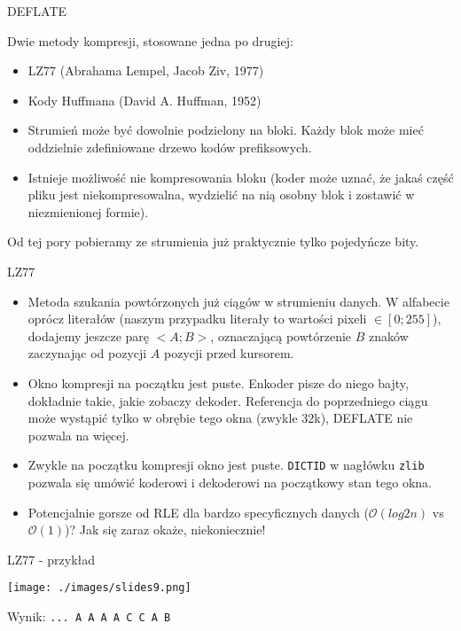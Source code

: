 \documentclass[presentation]{beamer}
\begin{document}
\begin{frame}[label={sec:org70d70d5}]{DEFLATE}
\begin{block}{Dwie metody kompresji, stosowane jedna po drugiej:}
\begin{itemize}
\item LZ77 (Abrahama Lempel, Jacob Ziv, 1977)
\item Kody Huffmana (David A. Huffman, 1952)

\item Strumień może być dowolnie podzielony na bloki. Każdy blok może
mieć oddzielnie zdefiniowane drzewo kodów prefiksowych.
\item Istnieje możliwość nie kompresowania bloku (koder może uznać, że
jakaś część pliku jest niekompresowalna, wydzielić na nią osobny
blok i zostawić w niezmienionej formie).
\end{itemize}
\end{block}

\begin{block}{Od tej pory pobieramy ze strumienia już praktycznie tylko pojedyńcze bity.}
\end{block}
\end{frame}

\begin{frame}[label={sec:orgb832d4c}]{LZ77}
\begin{itemize}
\item Metoda szukania powtórzonych już ciągów w strumieniu danych. W
alfabecie oprócz literałów (naszym przypadku literały to
wartości pixeli \(\in [0; 255]\)), dodajemy jeszcze parę \(<A; B>\),
oznaczającą powtórzenie \(B\) znaków zaczynając od pozycji \(A\)
pozycji przed kursorem.
\item Okno kompresji na początku jest puste. Enkoder pisze do niego
bajty, dokładnie takie, jakie zobaczy dekoder. Referencja do
poprzedniego ciągu może wystąpić tylko w obrębie tego okna
(zwykle 32k), DEFLATE nie pozwala na więcej.
\item Zwykle na początku kompresji okno jest
puste. {\color{blue}\texttt{DICTID}} w
nagłówku \texttt{zlib} pozwala się umówić koderowi i dekoderowi
na początkowy stan tego okna.
\item Potencjalnie gorsze od RLE dla bardzo specyficznych danych
(\(\mathcal{O}(log{2}n)\) vs \(\mathcal{O}(1)\))? Jak się zaraz
okaże, niekoniecznie!
\end{itemize}
\end{frame}

\begin{frame}[label={sec:orgfd45e28}]{LZ77 - przykład}
\begin{center}
\texttt{[image: ./images/slides9.png]}
\end{center}
Wynik: {\color{red}\texttt{... A A A A C C A B }}
\end{frame}
\end{document}
